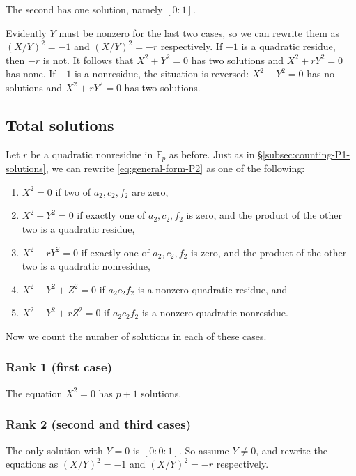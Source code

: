 \documentclass[10pt,a4paper]{amsart}
\numberwithin{equation}{section}
\numberwithin{figure}{section}
\theoremstyle{definition}
\theoremstyle{remark}
\theoremstyle{plain}
\theoremstyle{plain}
\theoremstyle{definition}
\theoremstyle{plain}
\theoremstyle{plain}
\newcommand{\F}{\mathbb{F}}
\begin{document}
	The second has one solution, namely $[0:1]$.
	
	Evidently $Y$ must be nonzero for the last two cases, so we can rewrite them as
	$(X/Y)^2 = -1$ and $(X/Y)^2 = -r$ respectively. If $-1$ is a quadratic residue,
	then $-r$ is not. It follows that $X^2 + Y^2 = 0$ has two solutions and $X^2 +
	rY^2 = 0$ has none. If $-1$ is a nonresidue, the situation is reversed: $X^2 +
	Y^2 = 0$ has no solutions and $X^2 + rY^2 = 0$ has two solutions.
	
	\subsection{Total solutions}
	\label{subsec:counting-P2-solutions}
	
	Let $r$ be a quadratic nonresidue in $\F_p$ as before. Just as in
	\S\ref{subsec:counting-P1-solutions}, we can rewrite \eqref{eq:general-form-P2}
	as one of the following: 
	\begin{enumerate} 
		\item $X^2 = 0$ if two of $a_2, c_2, f_2$ are zero, 
		\item\label{case:rank2_x^2+y^2=0} $X^2 + Y^2 = 0$ if exactly one of $a_2, c_2, f_2$ is zero,
		and the product of the other two is a quadratic residue, 
		\item\label{case:rank2_x^2+ry^2=0} $X^2 + rY^2 = 0$ if exactly one of $a_2, c_2, f_2$ is zero, 
		and the product of the other two is a quadratic nonresidue, 
		\item\label{case:rank3_x^2+y^2+z^2=0} $X^2 + Y^2 + Z^2 = 0$ if $a_2 c_2 f_2$ is a nonzero quadratic residue, and 
		\item\label{case:rank3_x^2+y^2+rz^2=0} $X^2 + Y^2 + rZ^2 = 0$ if $a_2 c_2 f_2$ is
		a nonzero quadratic nonresidue.  
	\end{enumerate}
	
	Now we count the number of solutions in each of these cases.
	
	\subsubsection*{Rank 1 (first case)} 
	The equation $X^2 = 0$ has $p + 1$ solutions.
	
	\subsubsection*{Rank 2 (second and third cases)} 
	The only solution with $Y=0$ is $[0:0:1]$. So assume $Y \neq 0$, and rewrite the 
	equations as $(X/Y)^2 = -1$ and $(X/Y)^2 = -r$ respectively.
	
\end{document}
